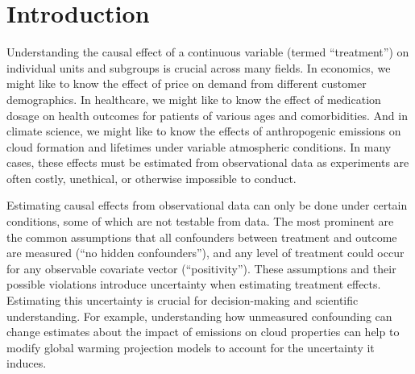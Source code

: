 \section{Introduction}
\label{sec:introduction}
Understanding the causal effect of a continuous variable (termed ``treatment'') on individual units and subgroups is crucial across many fields. 
In economics, we might like to know the effect of price on demand from different customer demographics. 
In healthcare, we might like to know the effect of medication dosage on health outcomes for patients of various ages and comorbidities. 
And in climate science, we might like to know the effects of anthropogenic emissions on cloud formation and lifetimes under variable atmospheric conditions. 
In many cases, these effects must be estimated from observational data as experiments are often costly, unethical, or otherwise impossible to conduct. 

Estimating causal effects from observational data can only be done under certain conditions, some of which are not testable from data. 
The most prominent are the common assumptions that all confounders between treatment and outcome are measured (``no hidden confounders''), and any level of treatment could occur for any observable covariate vector (``positivity''). 
These assumptions and their possible violations introduce uncertainty when estimating treatment effects. 
Estimating this uncertainty is crucial for decision-making and scientific understanding.
For example, understanding how unmeasured confounding can change estimates about the impact of emissions on cloud properties can help to modify global warming projection models to account for the uncertainty it induces.  

